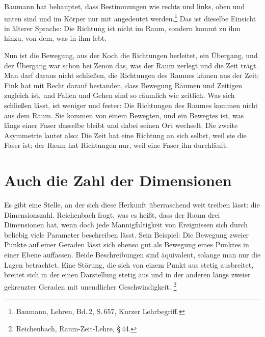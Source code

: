 Baumann hat behauptet, dass Bestimmungen wie rechts und links, oben und unten  sind und im Körper nur mit angedeutet werden.\footnote{Baumann, Lehren, Bd.\,2, S.\,657, Kurzer Lehrbegriff.} Das ist dieselbe Einsicht in älterer Sprache: Die Richtung ist nicht im Raum, sondern kommt zu ihm hinzu, von dem, was in ihm lebt.

Nun ist die Bewegung, aus der Koch die Richtungen herleitet, ein Übergang, und der Übergang war schon bei Zenon das, was der Raum zerlegt und die Zeit trägt. Man darf daraus nicht schließen, die Richtungen des Raumes kämen aus der Zeit; Fink hat mit Recht darauf bestanden, dass Bewegung Räumen und Zeitigen zugleich ist, und Fallen und Gehen sind so räumlich wie zeitlich. Was sich schließen lässt, ist weniger und fester: Die Richtungen des Raumes kommen nicht aus dem Raum. Sie kommen von einem Bewegten, und ein Bewegtes ist, was längs einer Faser dasselbe bleibt und dabei seinen Ort wechselt. Die zweite Asymmetrie lautet also: Die Zeit hat eine Richtung an sich selbst, weil sie die Faser ist; der Raum hat Richtungen nur, weil eine Faser ihn durchläuft.

\section{Auch die Zahl der Dimensionen}

Es gibt eine Stelle, an der sich diese Herkunft überraschend weit treiben lässt: die Dimensionszahl. Reichenbach fragt, was es heißt, dass der Raum drei Dimensionen hat, wenn doch jede Mannigfaltigkeit von Ereignissen sich durch beliebig viele Parameter beschreiben lässt. Sein Beispiel: Die Bewegung zweier Punkte auf einer Geraden lässt sich ebenso gut als Bewegung eines Punktes in einer Ebene auffassen. Beide Beschreibungen sind äquivalent, solange man nur die Lagen betrachtet.  Eine Störung, die sich von einem Punkt aus stetig ausbreitet, breitet sich in der einen Darstellung stetig aus und in der anderen längs zweier gekreuzter Geraden mit unendlicher Geschwindigkeit. \footnote{Reichenbach, Raum-Zeit-Lehre, \S\,44.}

